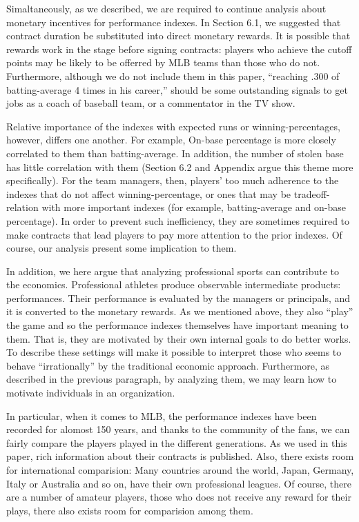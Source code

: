 \documentclass[dvipdfmx, 12pt]{article}
\begin{document}
Simaltaneously, as we described, we are required to continue analysis about monetary incentives for performance indexes. In Section 6.1, we suggested that contract duration be substituted into direct monetary rewards. It is possible that rewards work in the stage before signing contracts: players who achieve the cutoff points may be likely to be offerred by MLB teams than those who do not. Furthermore, although we do not include them in this paper, %
``reaching .300 of batting-average 4 times in his career,'' should be some outstanding signals to get jobs as a coach of baseball team, or a commentator in the TV show.

Relative importance of the indexes with expected runs or winning-percentages, however, differs one another. For example, On-base percentage is more closely correlated to them than batting-average. In addition, the number of stolen base has little correlation with them (Section 6.2 and Appendix argue this theme more specifically). For the team managers, then, players' too much adherence to the indexes that do not affect winning-percentage, or ones that may be tradeoff-relation with more important indexes (for example, batting-average and on-base percentage). In order to prevent such inefficiency, they are sometimes required to make contracts that lead players to pay more attention to the prior indexes. Of course, our analysis present some implication to them.

In addition, we here argue that analyzing professional sports can contribute to the economics. Professional athletes produce observable intermediate products: performances. Their performance is evaluated by the managers or principals, and it is converted to the monetary rewards. As we mentioned above, they also ``play'' the game and so the performance indexes themselves have important meaning to them. That is, they are motivated by their own internal goals to do better works. To describe these settings will make it possible to interpret those who seems to behave ``irrationally'' by the traditional economic approach. Furthermore, as described in the previous paragraph, by analyzing them, we may learn how to motivate individuals in an organization.

In particular, when it comes to MLB, the performance indexes have been recorded for alomost 150 years, and thanks to the community of the fans, we can fairly compare the players played in the different generations. As we used in this paper, rich information about their contracts is published. Also, there exists room for international comparision: Many countries around the world, Japan, Germany, Italy or Australia and so on, have their own professional leagues. Of course, there are a number of amateur players, those who does not receive any reward for their plays, there also exists room for comparision among them.
\end{document}
